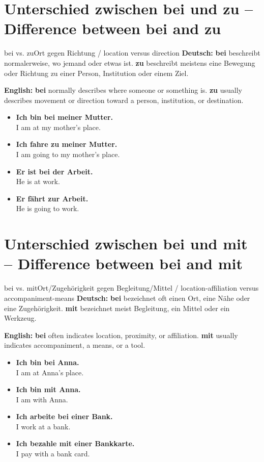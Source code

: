 \documentclass[a4paper,11pt]{article}
\newcommand{\GermanText}[1]{\textbf{Deutsch: }#1\par}
\newcommand{\EnglishText}[1]{{\small\color{SoftGray}\textbf{English: }#1\par}}
\newcommand{\ExampleItem}[2]{\item \textbf{#1}\\{\small\color{SoftGray}#2}}
\begin{document}
\section{Unterschied zwischen bei und zu -- Difference between bei and zu}
\begin{grammarentry}{bei vs. zu}{Ort gegen Richtung / location versus direction}
\GermanText{\textbf{bei} beschreibt normalerweise, wo jemand oder etwas ist. \textbf{zu} beschreibt meistens eine Bewegung oder Richtung zu einer Person, Institution oder einem Ziel.}
\EnglishText{\textbf{bei} normally describes where someone or something is. \textbf{zu} usually describes movement or direction toward a person, institution, or destination.}
\end{grammarentry}
\begin{exbox}\begin{itemize}
\ExampleItem{Ich bin bei meiner Mutter.}{I am at my mother's place.}
\ExampleItem{Ich fahre zu meiner Mutter.}{I am going to my mother's place.}
\ExampleItem{Er ist bei der Arbeit.}{He is at work.}
\ExampleItem{Er fährt zur Arbeit.}{He is going to work.}
\end{itemize}\end{exbox}

\section{Unterschied zwischen bei und mit -- Difference between bei and mit}
\begin{grammarentry}{bei vs. mit}{Ort/Zugehörigkeit gegen Begleitung/Mittel / location-affiliation versus accompaniment-means}
\GermanText{\textbf{bei} bezeichnet oft einen Ort, eine Nähe oder eine Zugehörigkeit. \textbf{mit} bezeichnet meist Begleitung, ein Mittel oder ein Werkzeug.}
\EnglishText{\textbf{bei} often indicates location, proximity, or affiliation. \textbf{mit} usually indicates accompaniment, a means, or a tool.}
\end{grammarentry}
\begin{exbox}\begin{itemize}
\ExampleItem{Ich bin bei Anna.}{I am at Anna's place.}
\ExampleItem{Ich bin mit Anna.}{I am with Anna.}
\ExampleItem{Ich arbeite bei einer Bank.}{I work at a bank.}
\ExampleItem{Ich bezahle mit einer Bankkarte.}{I pay with a bank card.}
\end{itemize}\end{exbox}
\end{document}
